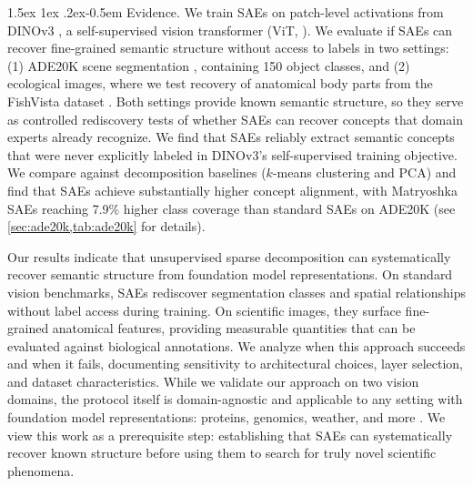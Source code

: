 \documentclass{article}
\makeatletter
\renewcommand{\paragraph}{%
  \@startsection{paragraph}{4}%
  {\z@}{1.5ex \@plus 1ex \@minus .2ex}{-0.5em}%
  {\normalfont\normalsize\bfseries}%
}
\theoremstyle{plain}
\theoremstyle{definition}
\theoremstyle{remark}
\makeatother
\begin{document}
\paragraph{Evidence.}
We train SAEs on patch-level activations from DINOv3 \citep{simeoni2025dinov3}, a self-supervised vision transformer (ViT, \cite{dosovitskiy2020vit}).
We evaluate if SAEs can recover fine-grained semantic structure without access to labels in two settings: (1) ADE20K scene segmentation \citep{zhou2017ade20k}, containing \num{150} object classes, and (2) ecological images, where we test recovery of anatomical body parts from the FishVista dataset \citep{mehrab2024fishvista,fishvistadataset}.
Both settings provide known semantic structure, so they serve as controlled rediscovery tests of whether SAEs can recover concepts that domain experts already recognize.
We find that SAEs reliably extract semantic concepts that were never explicitly labeled in DINOv3's self-supervised training objective.
We compare against decomposition baselines ($k$-means clustering and PCA) and find that SAEs achieve substantially higher concept alignment, with Matryoshka SAEs \citep{bussmann2025matryoshka} reaching \num{7.9}\% higher class coverage than standard SAEs on ADE20K (see \cref{sec:ade20k,tab:ade20k} for details).

Our results indicate that unsupervised sparse decomposition can systematically recover semantic structure from foundation model representations.
On standard vision benchmarks, SAEs rediscover segmentation classes and spatial relationships without label access during training.
On scientific images, they surface fine-grained anatomical features, providing measurable quantities that can be evaluated against biological annotations.
We analyze when this approach succeeds and when it fails, documenting sensitivity to architectural choices, layer selection, and dataset characteristics.
While we validate our approach on two vision domains, the protocol itself is domain-agnostic and applicable to any setting with foundation model representations: proteins, genomics, weather, and more \citep{abramson2024alphafold3,lam2023graphcast,cui2024scgpt}.
We view this work as a prerequisite step: establishing that SAEs can systematically recover known structure before using them to search for truly novel scientific phenomena.

\end{document}
